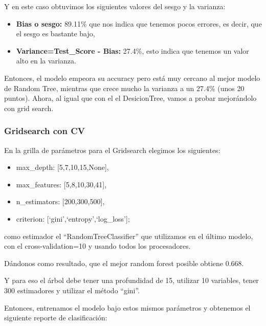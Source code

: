 \documentclass[a4paper]{article}
\begin{document}
            Y en este caso obtuvimos los siguientes valores del sesgo y la varianza:
            \begin{itemize}
                \item \textbf{Bias o sesgo:} 89.11\% que nos indica que tenemos pocos errores, es decir, que el sesgo es bastante bajo,
                \item \textbf{Variance=Test\_Score - Bias:} 27.4\%, esto indica que tenemos un valor alto en la varianza.
             \end{itemize}

            Entonces, el modelo empeora su accuracy pero está muy cercano al mejor modelo de Random Tree, mientras que crece mucho la varianza a un 27.4\% (unos 20 puntos). Ahora, al igual que con el el DesicionTree, vamos a probar mejorándolo con grid search.

        \subsubsection{Gridsearch con CV}

            En la grilla de parámetros para el Gridsearch elegimos los siguientes:
            \begin{itemize}
                \item max\_depth: [5,7,10,15,None],
                \item max\_features: [5,8,10,30,41],
                \item n\_estimators: [200,300,500],
                \item criterion: [`gini',`entropy',`log\_loss'];
            \end{itemize}
            como estimador el ``RandomTreeClassifier'' que utilizamos en el último modelo, con el cross-validation=10 y  usando todos los procesadores.

            Dándonos como resultado, que el mejor random forest posible obtiene 0.668. 

            Y para eso el árbol debe tener una profundidad de 15, utilizar  10  variables, tener  300  estimadores y utilizar el método ``gini''.
            
            Entonces, entrenamos el modelo bajo estos mismos parámetros y obtenemos el siguiente reporte de clasificación:
\end{document}
